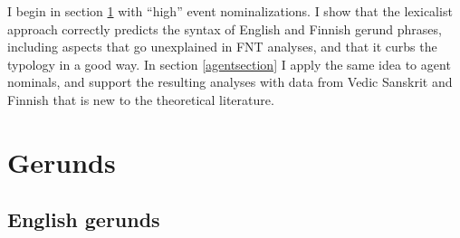 \documentclass[output=paper,
modfonts
]{LSP/langsci}
\begin{document}
I begin in section \ref{gerundsection} with ``high'' event nominalizations.  I show that
the lexicalist approach correctly predicts the syntax of English and Finnish gerund phrases,
including aspects that go unexplained in FNT analyses, and that it curbs the typology in a good
way.  In section \ref{agentsection} I apply the same idea to agent nominals, and support the
resulting analyses with data from Vedic Sanskrit and Finnish that is new to the theoretical
literature.

\section{Gerunds}\label{gerundsection}
\subsection{English gerunds}
\end{document}
